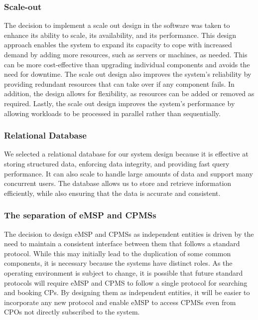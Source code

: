 \subsubsection{Scale-out}
The decision to implement a scale out design in the software was taken to enhance its ability to scale, its availability, and its performance. This design approach enables the system to expand its capacity to cope with increased demand by adding more resources, such as servers or machines, as needed. This can be more cost-effective than upgrading individual components and avoids the need for downtime. The scale out design also improves the system's reliability by providing redundant resources that can take over if any component fails. In addition, the design allows for flexibility, as resources can be added or removed as required. Lastly, the scale out design improves the system's performance by allowing workloads to be processed in parallel rather than sequentially.

\subsubsection{Relational Database}
We selected a relational database for our system design because it is effective at storing structured data, enforcing data integrity, and providing fast query performance. It can also scale to handle large amounts of data and support many concurrent users. The database allows us to store and retrieve information efficiently, while also ensuring that the data is accurate and consistent.
\subsubsection{The separation of eMSP and CPMSs}
The decision to design eMSP and CPMSs as independent entities is driven by the need to maintain a consistent interface between them that follows a standard protocol. While this may initially lead to the duplication of some common components, it is necessary because the systems have distinct roles. As the operating environment is subject to change, it is possible that future standard protocols will require eMSP and CPMS to follow a single protocol for searching and booking CPs. By designing them as independent entities, it will be easier to incorporate any new protocol and enable eMSP to access CPMSs even from CPOs not directly subscribed to the system.